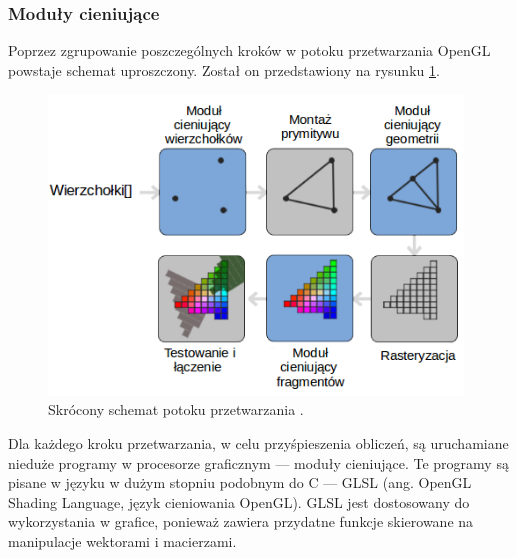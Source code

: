 \subsubsection{Moduły cieniujące}
Poprzez zgrupowanie poszczególnych kroków w potoku przetwarzania OpenGL powstaje schemat uproszczony. Został on przedstawiony na rysunku \ref{rys8}.
\begin{figure}[H]
		\centering
 		\includegraphics[width=11cm]{pipeline.png}
    	\caption{Skrócony schemat potoku przetwarzania \cite{opengltutorial}.}
 		\label{rys8}
\end{figure}
 
 Dla każdego kroku przetwarzania, w celu przyśpieszenia obliczeń, są uruchamiane nieduże programy w procesorze graficznym --- moduły cieniujące. Te programy są pisane w języku w dużym stopniu podobnym do C --- GLSL (ang. OpenGL Shading Language, język cieniowania OpenGL). GLSL jest dostosowany do wykorzystania w grafice, ponieważ zawiera przydatne funkcje skierowane na manipulacje wektorami i macierzami. 

